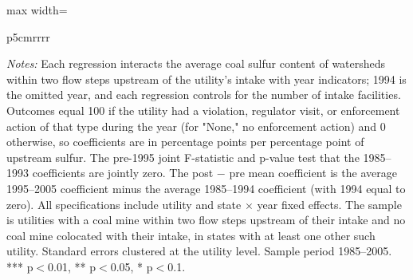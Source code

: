\begin{table}[htbp]
{\begin{adjustbox}{max width=\linewidth}
\begin{tabular}{p{5cm}rrrr}
\end{tabular}
\end{adjustbox}
}
\begin{minipage}{\linewidth}
\vspace{4pt}
\footnotesize
\raggedright
\textit{Notes:} Each regression interacts the average coal sulfur content of watersheds within two flow steps upstream of the utility's intake with year indicators; 1994 is the omitted year, and each regression controls for the number of intake facilities. Outcomes equal 100 if the utility had a violation, regulator visit, or enforcement action of that type during the year (for "None," no enforcement action) and 0 otherwise, so coefficients are in percentage points per percentage point of upstream sulfur. The pre-1995 joint F-statistic and p-value test that the 1985--1993 coefficients are jointly zero. The post $-$ pre mean coefficient is the average 1995--2005 coefficient minus the average 1985--1994 coefficient (with 1994 equal to zero). All specifications include utility and state $\times$ year fixed effects. The sample is utilities with a coal mine within two flow steps upstream of their intake and no coal mine colocated with their intake, in states with at least one other such utility. Standard errors clustered at the utility level. Sample period 1985--2005. *** p$<$0.01, ** p$<$0.05, * p$<$0.1.
\end{minipage}
\end{table}
